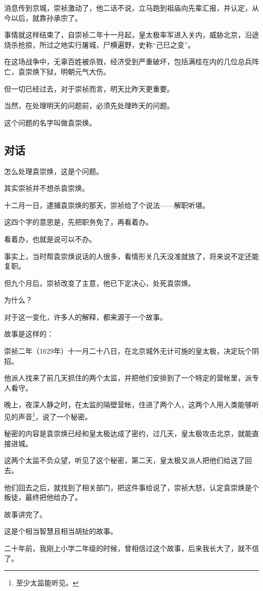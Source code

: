 \begin{multicols}{\theparacolNo}
消息传到京城，崇祯激动了，他二话不说，立马跑到祖庙向先辈汇报，并认定，从今以后，就靠孙承宗了。

事情就这样结束了，自崇祯二年十一月起，皇太极率军进入关内，威胁北京，沿途烧杀抢掠，所过之地实行屠城，尸横遍野，史称“己巳之变”。

在这场战争中，无辜百姓被杀戮，经济受到严重破坏，包括满桂在内的几位总兵阵亡，袁崇焕下狱，明朝元气大伤。

但一切已经过去，对于崇祯而言，明天比昨天更重要。

当然，在处理明天的问题前，必须先处理昨天的问题。

这个问题的名字叫做袁崇焕。

\subsection{对话}
怎么处理袁崇焕，这是个问题。

其实崇祯并不想杀袁崇焕。

十二月一日，逮捕袁崇焕的那天，崇祯给了个说法——解职听堪。

这四个字的意思是，先把职务免了，再看着办。

看着办，也就是说可以不办。

事实上，当时帮袁崇焕说话的人很多，看情形关几天没准就放了，将来说不定还能复职。

但九个月后，崇祯改变了主意，他已下定决心，处死袁崇焕。

为什么？

对于这一变化，许多人的解释，都来源于一个故事。

故事是这样的：

崇祯二年（1629年）十一月二十八日，在北京城外无计可施的皇太极，决定玩个阴招。

他派人找来了前几天抓住的两个太监，并把他们安排到了一个特定的营帐里，派专人看守。

晚上，夜深人静之时，在太监的隔壁营帐，住进了两个人，这两个人用人类能够听见的声音\footnote{至少太监能听见。}，说了一个秘密。

秘密的内容是袁崇焕已经和皇太极达成了密约，过几天，皇太极攻击北京，就能直接进城。

这两个太监不负众望，听见了这个秘密，第二天，皇太极又派人把他们给送了回去。

他们回去之后，就找到了相关部门，把这件事给说了，崇祯大怒，认定袁崇焕是个叛徒，最终把他给办了。

故事讲完了。

这是个相当智慧且相当胡扯的故事。

二十年前，我刚上小学二年级的时候，曾相信过这个故事，后来我长大了，就不信了。


\end{multicols}
